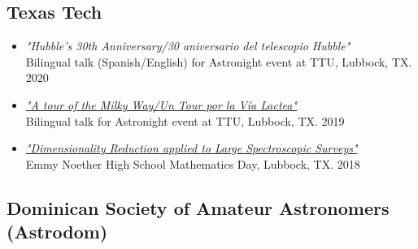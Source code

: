 \documentclass[letterpaper,10pt]{article}
\begin{document}
\subsection*{Texas Tech}

\begin{itemize}[label=$\blacktriangleright$]


	\item \textit{"Hubble's 30th Anniversary/30 aniversario del telescopio Hubble"} \\ Bilingual talk (Spanish/English) for Astronight event at TTU, Lubbock, TX. 2020


	\item \textit{\href{https://slides.com/mmarcano22/a-tour-of-the-milky-way-2\#/}{"A tour of the Milky Way/Un Tour por la V\'ia Lactea"}} \\ Bilingual talk for Astronight event at TTU, Lubbock, TX. 2019


	\item \textit{\href{http://manuelpm.me/PCASDSS/}{"Dimensionality Reduction applied to Large Spectroscopic Surveys"}} \\ Emmy Noether High School Mathematics Day, Lubbock, TX. 2018




\end{itemize}


\subsection*{Dominican Society of Amateur Astronomers (Astrodom)}
\end{document}
